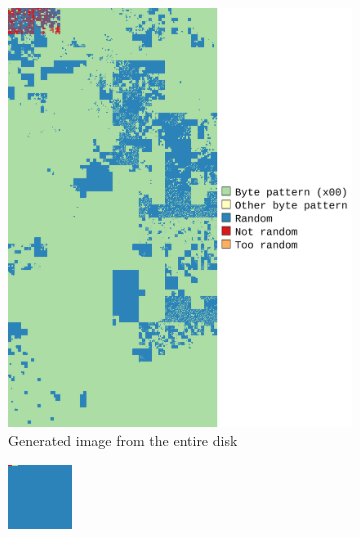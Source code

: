\documentclass[
  digital, %
  oneside, %
  lof,     %
  lot,     %
]{fithesis4}
\begin{document}
\begin{figure}
  \centering
  \begin{subfigure}[t]{.45\textwidth}
    \centering
    \includegraphics[width=\textwidth,interpolate=false]{figures/pv204_fde-chi2-4-hilbert.png}
    \caption{Generated image from the entire disk}
    \label{fig:idk2-unenc}
  \end{subfigure}
  \hfill
  \begin{subfigure}[t]{.45\textwidth}
    \centering
    \includegraphics[width=\textwidth,interpolate=false]{figures/luks-header.png}

\end{subfigure}
\end{figure}
\end{document}
